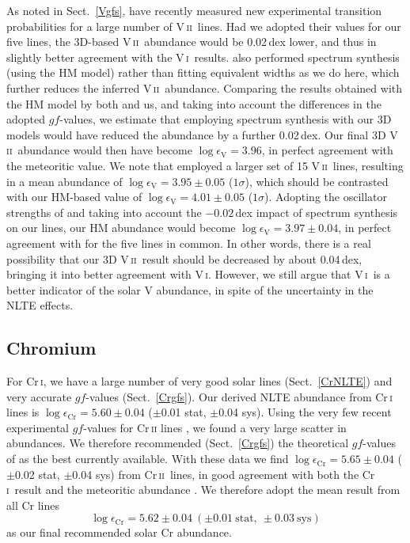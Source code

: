 \documentclass[traditabstract]{aa}
\newcommand{\altvi}{V\,\textsc{i}}
\newcommand{\altvii}{V\,\textsc{ii}}
\newcommand{\altcri}{Cr\,\textsc{i}}
\newcommand{\altcrii}{Cr\,\textsc{ii}}
\newcommand{\vi}{\altvi\ }
\newcommand{\vii}{\altvii\ }
\newcommand{\cri}{\altcri\ }
\newcommand{\crii}{\altcrii\ }
\begin{document}
As noted in Sect.\ \ref{Vgfs}, \citet{Wood14V2} have recently measured new experimental transition probabilities for a large number of \vii lines. Had we adopted their values for our five lines, the 3D-based \vii abundance would be 0.02\,dex lower, and thus in slightly better agreement with the \vi results. \citeauthor{Wood14V2} also performed spectrum synthesis (using the HM model) rather than fitting equivalent widths as we do here, which further reduces the inferred \vii abundance.  Comparing the results obtained with the HM model by both \citeauthor{Wood14V2} and us, and taking into account the differences in the adopted $gf$-values, we estimate that employing spectrum synthesis with our 3D models would have reduced the abundance by a further 0.02\,dex. Our final 3D \vii abundance would then have become $\log \epsilon_\mathrm{V}=3.96$, in perfect agreement with the meteoritic value. We note that \citeauthor{Wood14V2} employed a larger set of 15 \vii lines, resulting in a mean abundance of $\log \epsilon_\mathrm{V}=3.95\pm0.05$ ($1\sigma$), which should be contrasted with our HM-based value of $\log \epsilon_\mathrm{V}=4.01\pm0.05$ ($1\sigma$).  Adopting the oscillator strengths of \citeauthor{Wood14V2} and taking into account the $-0.02$\,dex impact of spectrum synthesis on our lines, our HM abundance would become $\log \epsilon_\mathrm{V}=3.97\pm0.04$, in perfect agreement with \citeauthor{Wood14V2} for the five lines in common.  In other words, there is a real possibility that our 3D \vii result should be decreased by about 0.04\,dex, bringing it into better agreement with \altvi. However, we still argue that \vi is a better indicator of the solar V abundance, in spite of the uncertainty in the NLTE effects.

\subsection{Chromium}
\label{Crresults}
For Cr\,\textsc{i}, we have a large number of very good solar lines (Sect.~\ref{CrNLTE}) and
very accurate $gf$-values (Sect.~\ref{Crgfs}).  Our derived NLTE abundance from \cri 
lines is $\log \epsilon_\mathrm{Cr}=5.60\pm0.04$ ($\pm$0.01 stat, $\pm$0.04 sys).  Using the very few recent experimental $gf$-values for Cr\,\textsc{ii} lines \citep{Nilsson06}, we found a very large scatter in
abundances. We therefore recommended (Sect.~\ref{Crgfs}) the theoretical $gf$-values of \citet{Kuruczweb} as the best currently available. With these data we find $\log \epsilon_\mathrm{Cr}=5.65\pm0.04$ ($\pm$0.02 stat, $\pm$0.04 sys) from \crii lines, in good agreement with both the \cri result and the meteoritic
abundance \citep[$5.64\pm0.01$;][]{Lodders09}.  We therefore adopt the mean result from all Cr lines
\begin{displaymath}
\log \epsilon_\mathrm{Cr}=5.62\pm0.04\ (\pm0.01\ \mathrm{stat},\ \pm0.03\ \mathrm{sys})
\end{displaymath}
as our final recommended solar Cr abundance.
\end{document}

